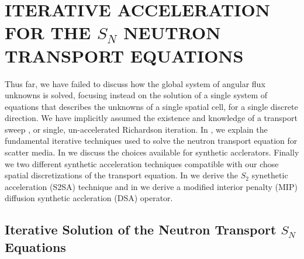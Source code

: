 %
%
%



\chapter{\uppercase{Iterative Acceleration for the $S_N$ Neutron Transport Equations}}
\label{sec:chapter4_acceleration}

Thus far, we have failed to discuss how the global system of angular flux unknowns is solved, 
focusing instead on the solution of a single system of equations that describes the unknowns of a single spatial cell, for a single discrete direction.
We have implicitly assumed the existence and knowledge of a transport sweep \cite{lewis_book}, or single, un-accelerated Richardson iteration.
In , we explain the fundamental iterative techniques used to solve the neutron transport equation for scatter media.
In  we discuss the choices available for synthetic acclerators.
Finally  we two different synthetic acceleration techniques compatible with our chose spatial discretizations of the transport equation.
In  we derive the $S_2$ synethetic acceleration (S2SA) technique\cite{s2sa} and in  we derive a modified interior penalty (MIP) diffusion synthetic accleration\cite{mip_dsa} (DSA)
operator.


\section{Iterative Solution of the Neutron Transport $S_N$ Equations}
\label{sec:dsa_basis}

